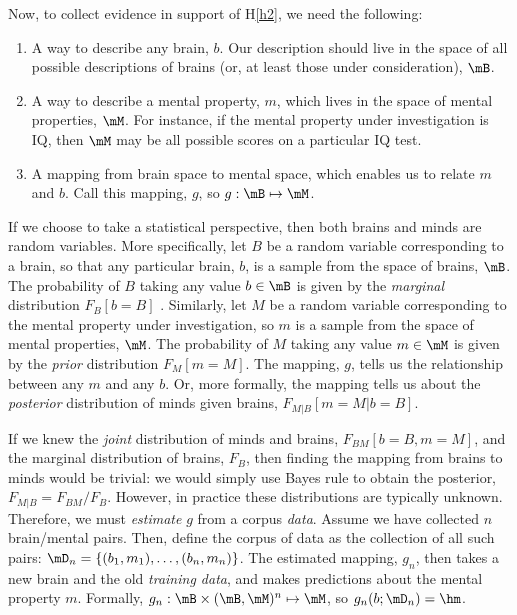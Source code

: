 Now, to collect evidence in support of H\ref{h2}, we need the following:
\begin{enumerate}
	\item A way to describe any brain, $b$. Our description should live in the space of all possible descriptions of brains (or, at least those under consideration), $\mB$. 
	\item A way to describe a mental property, $m$, which lives in the space of mental properties, $\mM$. For instance, if the mental property under investigation is IQ, then $\mM$ may be all possible scores on a particular IQ test. 
	\item A mapping from brain space to mental space, which enables us to relate $m$ and $b$. Call this mapping, $g$, so $g: \mB \mapsto \mM$. 
\end{enumerate}

If we choose to take a statistical perspective, then both brains and minds are random variables. More specifically, let $B$ be a random variable corresponding to a brain, so that any particular brain, $b$, is a sample from the space of brains, $\mB$. The probability of $B$ taking any value $b \in \mB$ is given by the \emph{marginal} distribution $F_B[b = B]$%
. Similarly, let $M$ be a random variable corresponding to the mental property under investigation, so $m$ is a sample from the space of mental properties, $\mM$. The probability of $M$ taking any value $m \in \mM$ is given by the \emph{prior} distribution $F_M[m = M]$. The mapping, $g$, tells us the relationship between any $m$ and any $b$. Or, more formally, the mapping tells us about the \emph{posterior} distribution of minds given brains, $F_{M|B}[m=M | b=B]$. 

If we knew the \emph{joint} distribution of minds and brains, $F_{BM}[b=B,m=M]$, and the marginal distribution of brains, $F_B$, then finding the mapping from brains to minds would be trivial: we would simply use Bayes rule to obtain the posterior, $F_{M|B} = F_{BM}/F_B$. However, in practice these distributions are typically unknown. Therefore, we must \emph{estimate} $g$ from a corpus \emph{data}. Assume we have collected $n$ brain/mental pairs. Then, define the corpus of data as the collection of all such pairs: $\mD_n=\{(b_1,m_1), \ldots, (b_n,m_n)\}$. The estimated mapping, $g_n$, then takes a new brain and the old \emph{training data}, and makes predictions about the mental property $m$. Formally, $g_n: \mB \times (\mB, \mM)^n \mapsto \mM$, so $g_n(b; \mD_n)=\hm$.

